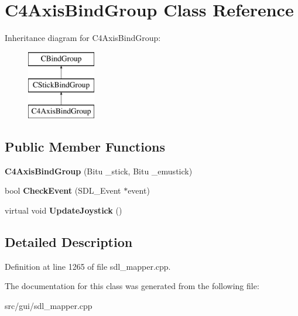 \hypertarget{classC4AxisBindGroup}{\section{C4\-Axis\-Bind\-Group Class Reference}
\label{classC4AxisBindGroup}
}
Inheritance diagram for C4\-Axis\-Bind\-Group\-:\begin{figure}[H]
\begin{center}
\leavevmode
\includegraphics[height=3.000000cm]{classC4AxisBindGroup}
\end{center}
\end{figure}
\subsection*{Public Member Functions}
\begin{DoxyCompactItemize}
\item 
\hypertarget{classC4AxisBindGroup_a18f535cb78f267a882176039fa912394}{{\bfseries C4\-Axis\-Bind\-Group} (Bitu \-\_\-stick, Bitu \-\_\-emustick)}\label{classC4AxisBindGroup_a18f535cb78f267a882176039fa912394}

\item 
\hypertarget{classC4AxisBindGroup_a895bb30dd9adc0b2a704e30d954b7f5e}{bool {\bfseries Check\-Event} (S\-D\-L\-\_\-\-Event $\ast$event)}\label{classC4AxisBindGroup_a895bb30dd9adc0b2a704e30d954b7f5e}

\item 
\hypertarget{classC4AxisBindGroup_a2de71ed1c0b11f15403f1a63ea7f9169}{virtual void {\bfseries Update\-Joystick} ()}\label{classC4AxisBindGroup_a2de71ed1c0b11f15403f1a63ea7f9169}

\end{DoxyCompactItemize}


\subsection{Detailed Description}


Definition at line 1265 of file sdl\-\_\-mapper.\-cpp.



The documentation for this class was generated from the following file\-:\begin{DoxyCompactItemize}
\item 
src/gui/sdl\-\_\-mapper.\-cpp\end{DoxyCompactItemize}
